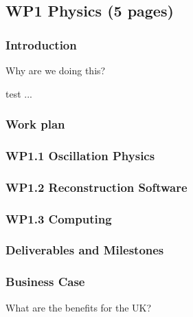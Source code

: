 \subsection{WP1 Physics (5 pages)}

\subsubsection{Introduction}

Why are we doing this?

test ...

\subsubsection{Work plan}
\subsubsection{WP1.1 Oscillation Physics}
\subsubsection{WP1.2 Reconstruction Software}
\subsubsection{WP1.3 Computing}

\subsubsection{Deliverables and Milestones}

\subsubsection{Business Case}

What are the benefits for the UK?
